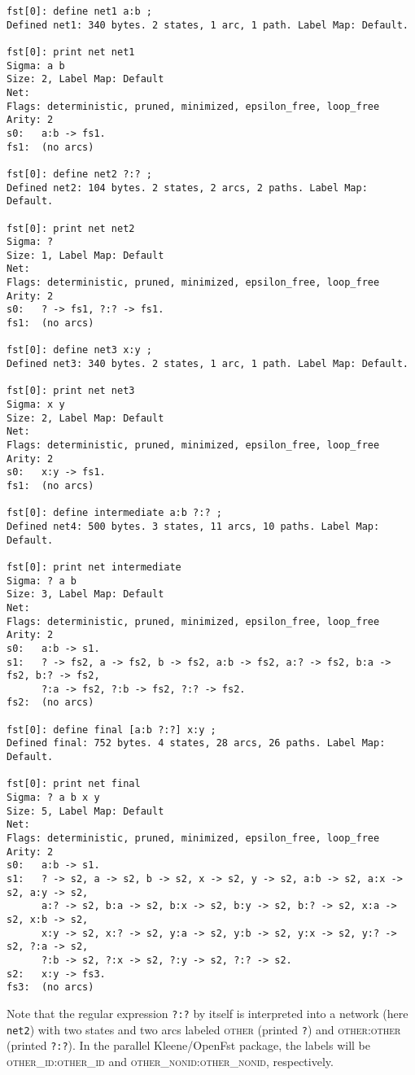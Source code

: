 \documentclass[letterpaper,11pt]{article}
\providecommand{\acro}{}\renewcommand{\acro}{\textsc}
\begin{document}
\begin{Verbatim}[fontsize=\footnotesize]
fst[0]: define net1 a:b ;
Defined net1: 340 bytes. 2 states, 1 arc, 1 path. Label Map: Default.

fst[0]: print net net1
Sigma: a b
Size: 2, Label Map: Default
Net: 
Flags: deterministic, pruned, minimized, epsilon_free, loop_free
Arity: 2
s0:   a:b -> fs1.
fs1:  (no arcs)

fst[0]: define net2 ?:? ;
Defined net2: 104 bytes. 2 states, 2 arcs, 2 paths. Label Map: Default.

fst[0]: print net net2
Sigma: ?
Size: 1, Label Map: Default
Net: 
Flags: deterministic, pruned, minimized, epsilon_free, loop_free
Arity: 2
s0:   ? -> fs1, ?:? -> fs1.
fs1:  (no arcs)

fst[0]: define net3 x:y ;
Defined net3: 340 bytes. 2 states, 1 arc, 1 path. Label Map: Default.

fst[0]: print net net3
Sigma: x y
Size: 2, Label Map: Default
Net: 
Flags: deterministic, pruned, minimized, epsilon_free, loop_free
Arity: 2
s0:   x:y -> fs1.
fs1:  (no arcs)

fst[0]: define intermediate a:b ?:? ;
Defined net4: 500 bytes. 3 states, 11 arcs, 10 paths. Label Map: Default.

fst[0]: print net intermediate
Sigma: ? a b
Size: 3, Label Map: Default
Net: 
Flags: deterministic, pruned, minimized, epsilon_free, loop_free
Arity: 2
s0:   a:b -> s1.
s1:   ? -> fs2, a -> fs2, b -> fs2, a:b -> fs2, a:? -> fs2, b:a -> fs2, b:? -> fs2,
      ?:a -> fs2, ?:b -> fs2, ?:? -> fs2.
fs2:  (no arcs)

fst[0]: define final [a:b ?:?] x:y ;
Defined final: 752 bytes. 4 states, 28 arcs, 26 paths. Label Map: Default.

fst[0]: print net final
Sigma: ? a b x y
Size: 5, Label Map: Default
Net: 
Flags: deterministic, pruned, minimized, epsilon_free, loop_free
Arity: 2
s0:   a:b -> s1.
s1:   ? -> s2, a -> s2, b -> s2, x -> s2, y -> s2, a:b -> s2, a:x -> s2, a:y -> s2,
      a:? -> s2, b:a -> s2, b:x -> s2, b:y -> s2, b:? -> s2, x:a -> s2, x:b -> s2,
      x:y -> s2, x:? -> s2, y:a -> s2, y:b -> s2, y:x -> s2, y:? -> s2, ?:a -> s2,
      ?:b -> s2, ?:x -> s2, ?:y -> s2, ?:? -> s2.
s2:   x:y -> fs3.
fs3:  (no arcs)
\end{Verbatim}


\noindent
Note that the regular expression \texttt{?:?} by itself is
interpreted into a network (here \texttt{net2}) with two states and two arcs labeled
\acro{other} (printed \texttt{?}) and \acro{other:other} (printed \texttt{?:?}).  
In the parallel Kleene/OpenFst package, the labels
will be \acro{other\_id}:\acro{other\_id} and \acro{other\_nonid}:\acro{other\_nonid}, respectively.
\end{document}
